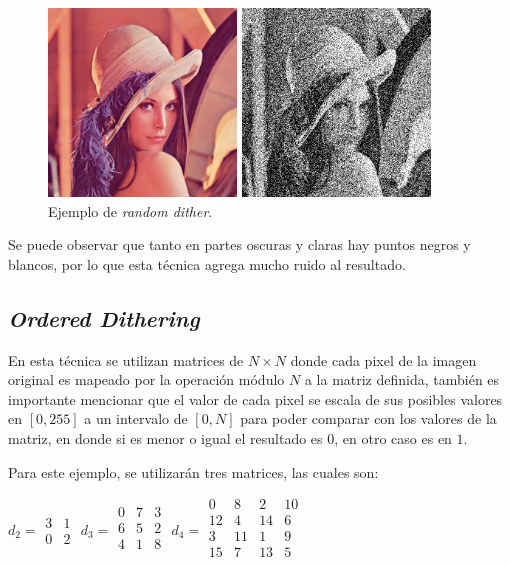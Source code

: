 \documentclass[conference]{IEEEtran}
\begin{document}
\begin{figure}[htbp]
\centerline{\includegraphics[height=50mm]{code/lena}}
\centerline{\includegraphics[height=50mm]{code/random_dither_lena}}
\caption{Ejemplo de \textit{random dither}.}
\label{random}
\end{figure}

Se puede observar que tanto en partes oscuras y claras hay puntos negros y blancos, por lo que esta técnica agrega mucho ruido al resultado.


\subsection{\textit{Ordered Dithering}}

En esta técnica se utilizan matrices de $N\times N$ donde cada pixel de la imagen original es mapeado por la operación módulo $N$ a la matriz definida, también es importante mencionar que el valor de cada pixel se escala de sus posibles valores en $[0,255]$ a un intervalo de $[0,N]$ para poder comparar con los valores de la matriz, en donde si es menor o igual el resultado es $0$, en otro caso es en $1$.

Para este ejemplo, se utilizarán tres matrices, las cuales son:

$d_2=\begin{matrix}
	3 & 1\\
	0 & 2
\end{matrix}$
$d_3=\begin{matrix}
	0 & 7 & 3\\
	6 & 5 & 2\\
	4 & 1 & 8\\
\end{matrix}$
$d_4=\begin{matrix}
	0 & 8 & 2 & 10\\
	12 & 4 & 14 & 6\\
	3 & 11 & 1 & 9\\
	15 & 7 & 13 & 5\\
\end{matrix}$
\end{document}
